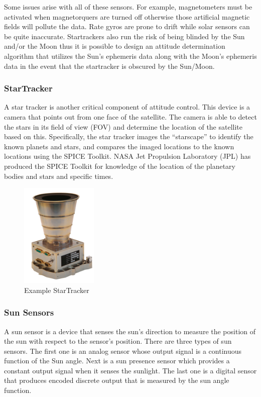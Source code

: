 \documentclass{article}
\begin{document}
Some issues arise with all of these sensors. For example,
magnetometers must be activated when magnetorquers are turned off
otherwise those artificial magnetic fields will pollute the data. Rate
gyros are prone to drift while solar sensors can be quite
inaccurate. Startrackers also run the risk of being blinded by the Sun
and/or the Moon thus it is possible to design an
attitude determination algorithm that utilizes the Sun's ephemeris data
along with the Moon's ephemeris data in the event that the startracker
is obscured by the Sun/Moon.

\subsubsection{StarTracker}

A star tracker is another critical component of attitude control. This
device is a camera that points out from one face of the satellite. The
camera is able to detect the stars in its field of view (FOV) and
determine the location of the satellite based on this. Specifically,
the star tracker images the “starscape” to identify the known planets
and stars, and compares the imaged locations to the known locations
using the SPICE Toolkit\cite{qp28}. NASA Jet Propulsion Laboratory (JPL) has
produced the SPICE Toolkit for knowledge of the location of the
planetary bodies and stars and specific times\cite{qp29}.
\begin{figure}[H]
  \begin{center}
  \includegraphics[height=50mm]{Figures/StarTracker}
  \end{center}
  \caption{Example StarTracker \cite{qp30}}
\end{figure}

\subsubsection{Sun Sensors}

A sun sensor is a device that senses the sun’s direction to measure
the position of the sun with respect to the sensor’s position. There
are three types of sun sensors. The first one is an analog sensor
whose output signal is a continuous function of the Sun angle. Next is
a sun presence sensor which provides a constant output signal when it
senses the sunlight. The last one is a digital sensor that produces
encoded discrete output that is measured by the sun angle function.
\end{document}

